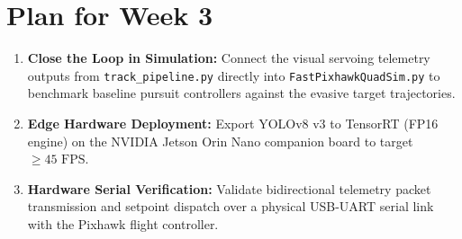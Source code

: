 \documentclass[11pt,a4paper]{article}
\begin{document}
\section{Plan for Week 3}
\begin{enumerate}[leftmargin=1.5em, itemsep=0.3em]
    \item \textbf{Close the Loop in Simulation:} Connect the visual servoing telemetry outputs from \texttt{track\_pipeline.py} directly into \texttt{FastPixhawkQuadSim.py} to benchmark baseline pursuit controllers against the evasive target trajectories.
    \item \textbf{Edge Hardware Deployment:} Export YOLOv8 v3 to TensorRT (FP16 engine) on the NVIDIA Jetson Orin Nano companion board to target $\ge 45\text{ FPS}$.
    \item \textbf{Hardware Serial Verification:} Validate bidirectional telemetry packet transmission and setpoint dispatch over a physical USB-UART serial link with the Pixhawk flight controller.
\end{enumerate}
\end{document}
